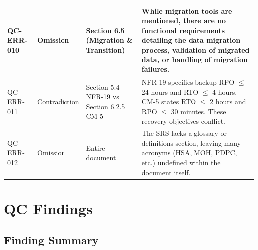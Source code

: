 \documentclass[11pt,a4paper]{article}
\begin{document}
\begin{longtable}{|>{\RaggedRight\arraybackslash}p{}|>{\RaggedRight\arraybackslash}p{}|>{\RaggedRight\arraybackslash}p{}|>{\RaggedRight\arraybackslash}p{}|}
\hline
QC-ERR-010 & Omission & Section 6.5 (Migration \& Transition) & While migration tools are mentioned, there are no functional requirements detailing the data migration process, validation of migrated data, or handling of migration failures. \\
\hline
QC-ERR-011 & Contradiction & Section 5.4 NFR-19 vs Section 6.2.5 CM-5 & NFR-19 specifies backup RPO $\leq$ 24 hours and RTO $\leq$ 4 hours. CM-5 states RTO $\leq$ 2 hours and RPO $\leq$ 30 minutes. These recovery objectives conflict. \\
\hline
QC-ERR-012 & Omission & Entire document & The SRS lacks a glossary or definitions section, leaving many acronyms (HSA, MOH, PDPC, etc.) undefined within the document itself. \\
\hline
\end{longtable}
\endgroup
\begin{center}
\addtocounter{table}{-1}
\label{tab:qc-error-detection}
\end{center}

\section{QC Findings}

\subsection{Finding Summary}
\end{document}
